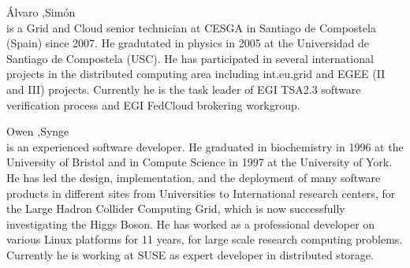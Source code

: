 \documentclass{cai}
\begin{document}
\bio{}\'Alvaro ,Sim\'on\\ is a Grid and Cloud senior technician at CESGA in Santiago de Compostela (Spain) since 2007. He gradutated in physics in 2005 at the Universidad de Santiago de Compostela (USC). He has participated in several international projects in the distributed computing area including int.eu.grid and EGEE (II and III) projects. Currently he is the task leader of EGI TSA2.3 software verification process and EGI FedCloud brokering workgroup.


\bio{}Owen ,Synge\\ is an experienced software developer. He graduated in biochemistry in 1996 at the University of Bristol and in Compute Science in 1997 at the University of York. He has led the design, implementation, and the deployment of many software products in different sites from Universities to International research centers, for the Large Hadron Collider Computing Grid, which is now successfully investigating the Higgs Boson. 
He has worked as a professional developer on various Linux platforms for 11 years, for large scale research computing problems. Currently he is working at SUSE as expert developer in distributed storage.


\label{lastpage}
\end{document}
